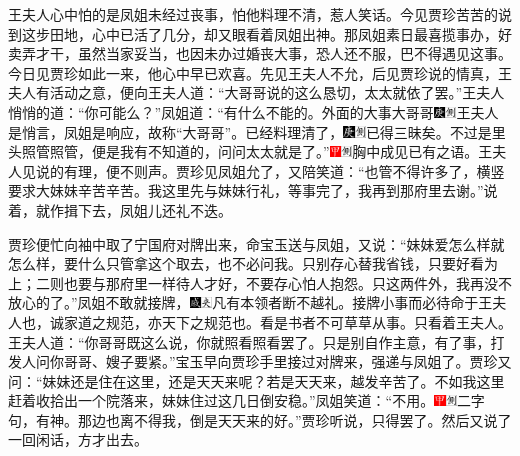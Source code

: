 王夫人心中怕的是凤姐未经过丧事，怕他料理不清，惹人笑话。今见贾珍苦苦的说到这步田地，心中已活了几分，却又眼看着凤姐出神。那凤姐素日最喜揽事办，好卖弄才干，虽然当家妥当，也因未办过婚丧大事，恐人还不服，巴不得遇见这事。今日见贾珍如此一来，他心中早已欢喜。先见王夫人不允，后见贾珍说的情真，王夫人有活动之意，便向王夫人道：“大哥哥说的这么恳切，太太就依了罢。”王夫人悄悄的道：“你可能么？”凤姐道：“有什么不能的。外面的大事大哥哥{\includegraphics[width=3mm]{../Images/00004}\includegraphics[width=3mm]{../Images/00011}\footnotesize \kaishu 王夫人是悄言，凤姐是响应，故称“大哥哥”。}已经料理清了，{\includegraphics[width=3mm]{../Images/00004}\includegraphics[width=3mm]{../Images/00011}\footnotesize \kaishu 已得三昧矣。}不过是里头照管照管，便是我有不知道的，问问太太就是了。”{\includegraphics[width=3mm]{../Images/00002}\includegraphics[width=3mm]{../Images/00011}\footnotesize \kaishu 胸中成见已有之语。}王夫人见说的有理，便不则声。贾珍见凤姐允了，又陪笑道：“也管不得许多了，横竖要求大妹妹辛苦辛苦。我这里先与妹妹行礼，等事完了，我再到那府里去谢。”说着，就作揖下去，凤姐儿还礼不迭。

贾珍便忙向袖中取了宁国府对牌出来，命宝玉送与凤姐，又说：“妹妹爱怎么样就怎么样，要什么只管拿这个取去，也不必问我。只别存心替我省钱，只要好看为上；二则也要与那府里一样待人才好，不要存心怕人抱怨。只这两件外，我再没不放心的了。”凤姐不敢就接牌，{\includegraphics[width=3mm]{../Images/00005}\includegraphics[width=3mm]{../Images/00012}\footnotesize \kaishu 凡有本领者断不越礼。接牌小事而必待命于王夫人也，诚家道之规范，亦天下之规范也。看是书者不可草草从事。}只看着王夫人。王夫人道：“你哥哥既这么说，你就照看照看罢了。只是别自作主意，有了事，打发人问你哥哥、嫂子要紧。”宝玉早向贾珍手里接过对牌来，强递与凤姐了。贾珍又问：“妹妹还是住在这里，还是天天来呢？若是天天来，越发辛苦了。不如我这里赶着收拾出一个院落来，妹妹住过这几日倒安稳。”凤姐笑道：“不用。{\includegraphics[width=3mm]{../Images/00002}\includegraphics[width=3mm]{../Images/00011}\footnotesize \kaishu 二字句，有神。}那边也离不得我，倒是天天来的好。”贾珍听说，只得罢了。然后又说了一回闲话，方才出去。

